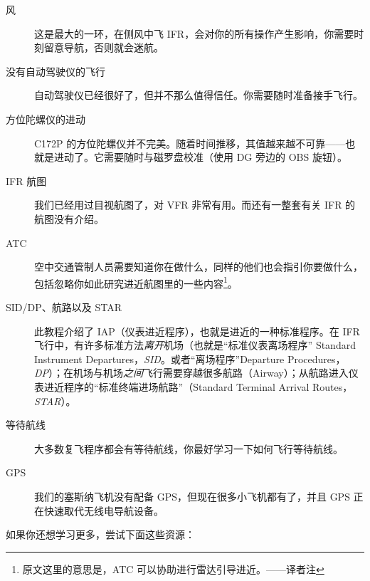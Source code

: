 \begin{description}
\item[风] 这是最大的一环，在侧风中飞 IFR，会对你的所有操作产生影响，你需要时刻留意导航，否则就会迷航。
\item[没有自动驾驶仪的飞行] 自动驾驶仪已经很好了，但并不那么值得信任。你需要随时准备接手飞行。
\item[方位陀螺仪的进动] C172P 的方位陀螺仪并不完美。随着时间推移，其值越来越不可靠——也就是进动了。它需要随时与磁罗盘校准（使用 DG 旁边的 OBS 旋钮）。
\item[IFR 航图] 我们已经用过目视航图了，对 VFR 非常有用。而还有一整套有关 IFR 的航图没有介绍。
\item[ATC] 空中交通管制人员需要知道你在做什么，同样的他们也会指引你要做什么，包括忽略你如此研究进近航图里的一些内容\footnote{原文这里的意思是，ATC 可以协助进行雷达引导进近。——译者注}。
\item[SID/DP、航路以及 STAR] 此教程介绍了 IAP（仪表进近程序），也就是进近的一种标准程序。在 IFR 飞行中，有许多标准方法\emph{离开}机场（也就是“标准仪表离场程序” Standard Instrument Departures，\emph{SID}。或者“离场程序”Departure Procedures，\emph{DP}）；在机场与机场\emph{之间}飞行需要穿越很多航路（Airway）；从航路进入仪表进近程序的“标准终端进场航路”（Standard Terminal Arrival Routes，\emph{STAR}）。
\item[等待航线] 大多数复飞程序都会有等待航线，你最好学习一下如何飞行等待航线。
\item[GPS] 我们的塞斯纳飞机没有配备 GPS，但现在很多小飞机都有了，并且 GPS 正在快速取代无线电导航设备。
\end{description}

如果你还想学习更多，尝试下面这些资源：

